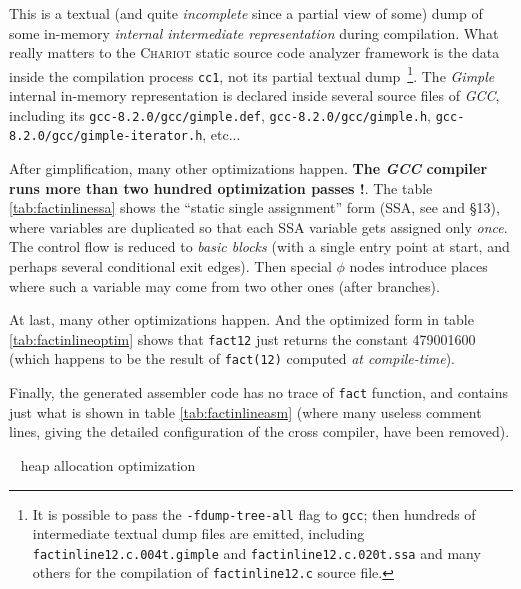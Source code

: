 This is a textual (and quite
\emph{incomplete} since a partial view of some) dump of some in-memory
\emph{internal intermediate representation} during compilation. What
really matters to the \textsc{Chariot} static source code analyzer
framework is the data inside the compilation process \texttt{cc1}, not
its partial textual dump~\footnote{It is possible to pass the
  \texttt{-fdump-tree-all} flag to \texttt{gcc}; then hundreds of
  intermediate textual dump files are emitted, including
  \texttt{factinline12.c.004t.gimple} and
  \texttt{factinline12.c.020t.ssa} and many others for the compilation
  of \texttt{factinline12.c} source file.}. The \emph{Gimple} internal
in-memory representation is declared inside several source files of
\emph{GCC}, including its \texttt{gcc-8.2.0/gcc/gimple.def},
\texttt{gcc-8.2.0/gcc/gimple.h},
\texttt{gcc-8.2.0/gcc/gimple-iterator.h}, etc...


After gimplification, many other optimizations happen. \textbf{The
  \emph{GCC} compiler runs more than two hundred optimization passes
  !}. The table
\ref{tab:factinlinessa} shows the ``static single assignment'' form
(SSA, see \cite{pop:ssa} and \cite{gcc-internals} §13), where variables are duplicated so that each SSA
variable gets assigned only \emph{once}. The control flow is reduced
to  \emph{basic blocks} (with a single entry point
at start, and perhaps several conditional exit edges). Then special
$\phi$ nodes introduce places where such a variable may come from two
other ones (after branches).




At last, many other optimizations happen. And the optimized form in
table \ref{tab:factinlineoptim} shows that \texttt{fact12} just
returns the constant 479001600 (which happens to be the result of
\texttt{fact(12)} computed \emph{at compile-time}).

\newpage

Finally, the generated assembler code has no trace of \texttt{fact}
function, and contains just what is shown in table
\ref{tab:factinlineasm} (where many useless comment lines, giving the
detailed configuration of the cross compiler, have been removed).



\pagebreak



{{\raisebox{3pt}{\textcolor{brown}{\rule{0.2\textwidth}{2.0pt}}}} ~ \large{heap allocation optimization}}

